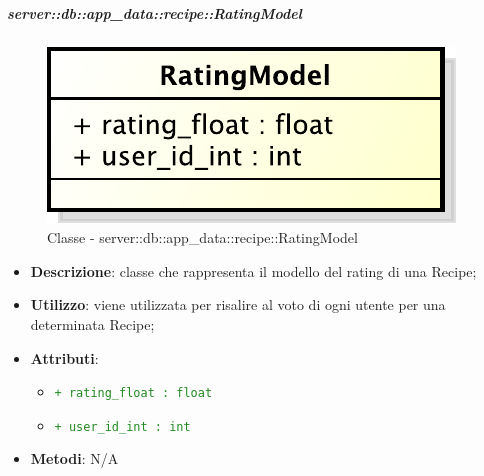 		\subparagraph{server::db::app\_data::recipe::RatingModel} %
		\label{subp:server_db_app_data_recipe_recipemodel}
			\begin{figure}[htbp]
				\centering
				\centerline{\includegraphics[scale=0.75]{./images/server/classes/db/rating_model.pdf}}
				\caption{Classe - server::db::app\_data::recipe::RatingModel}
			\end{figure}
			\begin{itemize}
				\item \textbf{Descrizione}: classe che rappresenta il modello del rating di una Recipe;
				\item \textbf{Utilizzo}: viene utilizzata per risalire al voto di ogni utente per una determinata Recipe;
				\item \textbf{Attributi}:
					\begin{itemize}
						\item \textcolor{forestgreen}{\texttt{+ rating\_float : float}}
						\item \textcolor{forestgreen}{\texttt{+ user\_id\_int : int}}
					\end{itemize}
				\item \textbf{Metodi}: N/A
			\end{itemize}


